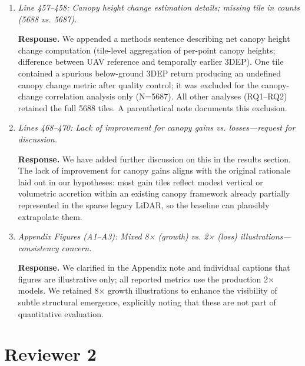 \documentclass[11pt]{article}
\newcommand{\response}{\textbf{Response.} }
\begin{document}
\begin{enumerate}
  \item \emph{Line 457–458: Canopy height change estimation details; missing tile in counts (5688 vs. 5687).}

  \response We appended a methods sentence describing net canopy height change computation (tile-level aggregation of per-point canopy heights; difference between UAV reference and temporally earlier 3DEP). One tile contained a spurious below-ground 3DEP return producing an undefined canopy change metric after quality control; it was excluded for the canopy-change correlation analysis only (N=5687). All other analyses (RQ1–RQ2) retained the full 5688 tiles. A parenthetical note documents this exclusion.

  \item \emph{Lines 468–470: Lack of improvement for canopy gains vs. losses—request for discussion.}

  \response We have added further discussion on this in the results section. The lack of improvement for canopy gains aligns with the original rationale laid out in our hypotheses: most gain tiles reflect modest vertical or volumetric accretion within an existing canopy framework already partially represented in the sparse legacy LiDAR, so the baseline can plausibly extrapolate them.

  \item \emph{Appendix Figures (A1–A3): Mixed 8× (growth) vs. 2× (loss) illustrations—consistency concern.}

  \response We clarified in the Appendix note and individual captions that figures are illustrative only; all reported metrics use the production 2× models. We retained 8× growth illustrations to enhance the visibility of subtle structural emergence, explicitly noting that these are not part of quantitative evaluation.

\end{enumerate}

\section*{Reviewer 2}
\end{document}
